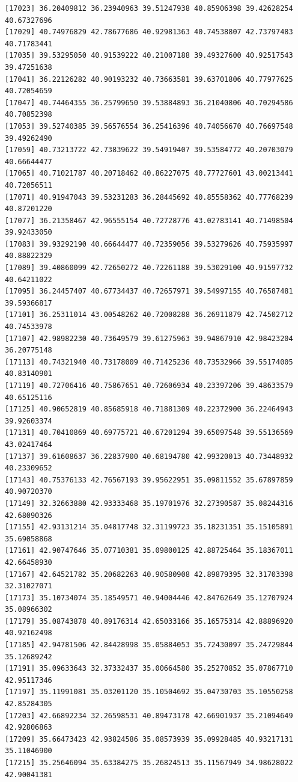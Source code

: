 \documentclass[
  letterpaper,
  DIV=11,
  numbers=noendperiod]{scrartcl}
\begin{document}
\begin{verbatim}
[17023] 36.20409812 36.23940963 39.51247938 40.85906398 39.42628254 40.67327696
[17029] 40.74976829 42.78677686 40.92981363 40.74538807 42.73797483 40.71783441
[17035] 39.53295050 40.91539222 40.21007188 39.49327600 40.92517543 39.47251638
[17041] 36.22126282 40.90193232 40.73663581 39.63701806 40.77977625 40.72054659
[17047] 40.74464355 36.25799650 39.53884893 36.21040806 40.70294586 40.70852398
[17053] 39.52740385 39.56576554 36.25416396 40.74056670 40.76697548 39.49262490
[17059] 40.73213722 42.73839622 39.54919407 39.53584772 40.20703079 40.66644477
[17065] 40.71021787 40.20718462 40.86227075 40.77727601 43.00213441 40.72056511
[17071] 40.91947043 39.53231283 36.28445692 40.85558362 40.77768239 40.87201220
[17077] 36.21358467 42.96555154 40.72728776 43.02783141 40.71498504 39.92433050
[17083] 39.93292190 40.66644477 40.72359056 39.53279626 40.75935997 40.88822329
[17089] 39.40860099 42.72650272 40.72261188 39.53029100 40.91597732 40.64211022
[17095] 36.24457407 40.67734437 40.72657971 39.54997155 40.76587481 39.59366817
[17101] 36.25311014 43.00548262 40.72008288 36.26911879 42.74502712 40.74533978
[17107] 42.98982230 40.73649579 39.61275963 39.94867910 42.98423204 36.20775148
[17113] 40.74321940 40.73178009 40.71425236 40.73532966 39.55174005 40.83140901
[17119] 40.72706416 40.75867651 40.72606934 40.23397206 39.48633579 40.65125116
[17125] 40.90652819 40.85685918 40.71881309 40.22372900 36.22464943 39.92603374
[17131] 40.70410869 40.69775721 40.67201294 39.65097548 39.55136569 43.02417464
[17137] 39.61608637 36.22837900 40.68194780 42.99320013 40.73448932 40.23309652
[17143] 40.75376133 42.76567193 39.95622951 35.09811552 35.67897859 40.90720370
[17149] 32.32663880 42.93333468 35.19701976 32.27390587 35.08244316 42.68090326
[17155] 42.93131214 35.04817748 32.31199723 35.18231351 35.15105891 35.69058868
[17161] 42.90747646 35.07710381 35.09800125 42.88725464 35.18367011 42.66458930
[17167] 42.64521782 35.20682263 40.90580908 42.89879395 32.31703398 32.31027071
[17173] 35.10734074 35.18549571 40.94004446 42.84762649 35.12707924 35.08966302
[17179] 35.08743878 40.89176314 42.65033166 35.16575314 42.88896920 40.92162498
[17185] 42.94781506 42.84428998 35.05884053 35.72430097 35.24729844 35.12689242
[17191] 35.09633643 32.37332437 35.00664580 35.25270852 35.07867710 42.95117346
[17197] 35.11991081 35.03201120 35.10504692 35.04730703 35.10550258 42.85284305
[17203] 42.66892234 32.26598531 40.89473178 42.66901937 35.21094649 42.92806863
[17209] 35.66473423 42.93824586 35.08573939 35.09928485 40.93217131 35.11046900
[17215] 35.25646094 35.63384275 35.26824513 35.11567949 34.98628022 42.90041381

\end{verbatim}
\end{document}
